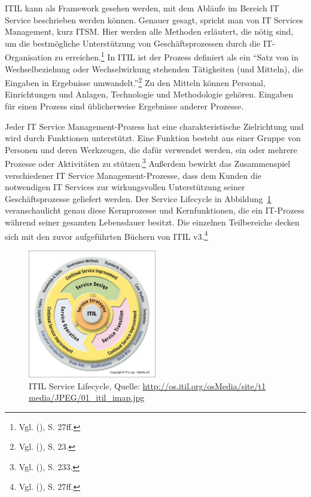 \noindent
ITIL kann als Framework gesehen werden, mit dem Abläufe im Bereich IT Service beschrieben werden können. Genauer gesagt, spricht man von IT Services Management, kurz ITSM. Hier werden alle Methoden erläutert, die nötig sind, um die bestmögliche Unterstützung von Geschäftsprozessen durch die IT-Organisation zu erreichen.\footnote{Vgl. \citeauthor{Ebel} (\citeyear{Ebel}), S. 27ff.} In ITIL ist der Prozess definiert als ein \enquote{Satz von in Wechselbeziehung oder Wechselwirkung stehenden Tätigkeiten (und Mitteln), die Eingaben in Ergebnisse umwandelt.}\footnote{Vgl. \citeauthor{ISO9000} (\citeyear{ISO9000}), S. 23.} Zu den Mitteln können Personal, Einrichtungen und Anlagen, Technologie und Methodologie gehören. Eingaben für einen Prozess sind üblicherweise  Ergebnisse anderer Prozesse.

\noindent
Jeder IT Service Management-Prozess hat eine charakteristische Zielrichtung und wird durch Funktionen unterstützt. Eine Funktion besteht aus einer Gruppe von Personen und deren Werkzeugen, die dafür verwendet werden, ein oder mehrere Prozesse oder Aktivitäten zu stützen.\footnote{Vgl. \citeauthor{Cannon} (\citeyear{Cannon}), S. 233.} Außerdem bewirkt das Zusammenspiel verschiedener IT Service Management-Prozesse, dass dem Kunden die notwendigen IT Services zur wirkungsvollen Unterstützung seiner Geschäftsprozesse geliefert werden. Der Service Lifecycle in Abbildung~\ref{fig:ITIL_Lebenyzyklus} veranschaulicht genau diese Kernprozesse und Kernfunktionen, die ein IT-Prozess während seiner gesamten Lebensdauer besitzt. Die einzelnen Teilbereiche decken sich mit den zuvor aufgeführten Büchern von ITIL v3.\footnote{Vgl. \citeauthor{Ebel} (\citeyear{Ebel}), S. 27ff.}

\begin{figure}[h!]
\centering
	\includegraphics[width=0.50\textwidth]{Abbildungen/ITIL_Lebenszyklus}
	\caption[ITIL Service Lifecycle]{ITIL Service Lifecycle, Quelle: \url{http://os.itil.org/osMedia/site/t1 
	media/JPEG/01_itil_imap.jpg}}
	\label{fig:ITIL_Lebenyzyklus}
\end{figure}

